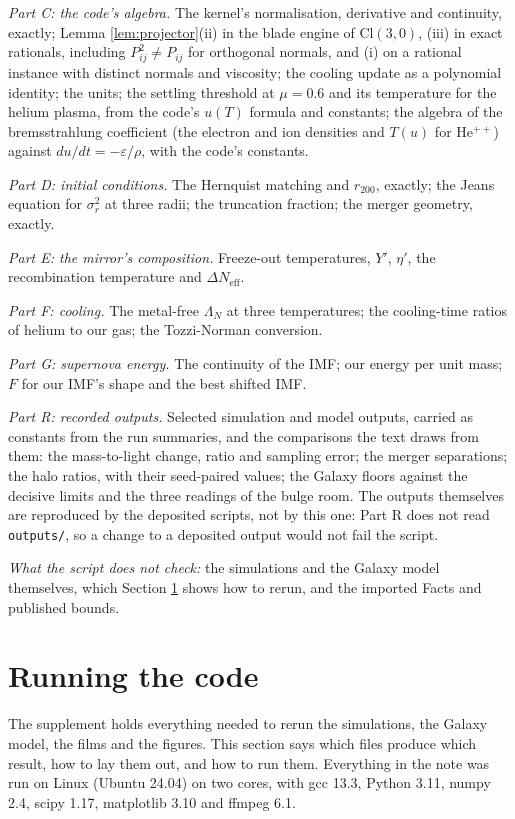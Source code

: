 \documentclass[11pt]{article}
\theoremstyle{definition}
\newcommand{\Cl}{\mathrm{Cl}}
\newcommand{\file}[1]{\texttt{#1}}
\begin{document}
\emph{Part C: the code's algebra.} The kernel's normalisation, derivative and continuity, exactly; Lemma \ref{lem:projector}(ii) in the blade engine of $\Cl(3,0)$, (iii) in exact rationals, including $P_{ij}^{2} \ne P_{ij}$ for orthogonal normals, and (i) on a rational instance with distinct normals and viscosity; the cooling update as a polynomial identity; the units; the settling threshold at $\mu = 0.6$ and its temperature for the helium plasma, from the code's $u(T)$ formula and constants; the algebra of the bremsstrahlung coefficient (the electron and ion densities and $T(u)$ for He$^{++}$) against $du/dt = -\varepsilon/\rho$, with the code's constants.

\emph{Part D: initial conditions.} The Hernquist matching and $r_{200}$, exactly; the Jeans equation for $\sigma_{r}^{2}$ at three radii; the truncation fraction; the merger geometry, exactly.

\emph{Part E: the mirror's composition.} Freeze-out temperatures, $Y'$, $\eta'$, the recombination temperature and $\Delta N_{\mathrm{eff}}$.

\emph{Part F: cooling.} The metal-free $\Lambda_{N}$ at three temperatures; the cooling-time ratios of helium to our gas; the Tozzi-Norman conversion.

\emph{Part G: supernova energy.} The continuity of the IMF; our energy per unit mass; $F$ for our IMF's shape and the best shifted IMF.

\emph{Part R: recorded outputs.} Selected simulation and model outputs, carried as constants from the run summaries, and the comparisons the text draws from them: the mass-to-light change, ratio and sampling error; the merger separations; the halo ratios, with their seed-paired values; the Galaxy floors against the decisive limits and the three readings of the bulge room. The outputs themselves are reproduced by the deposited scripts, not by this one: Part R does not read \file{outputs/}, so a change to a deposited output would not fail the script.

\emph{What the script does not check:} the simulations and the Galaxy model themselves, which Section \ref{sec:running} shows how to rerun, and the imported Facts and published bounds.

\section{Running the code}\label{sec:running}

The supplement \cite{ButlerSuppT14b} holds everything needed to rerun the simulations, the Galaxy model, the films and the figures. This section says which files produce which result, how to lay them out, and how to run them. Everything in the note was run on Linux (Ubuntu 24.04) on two cores, with gcc 13.3, Python 3.11, numpy 2.4, scipy 1.17, matplotlib 3.10 and ffmpeg 6.1.
\end{document}
